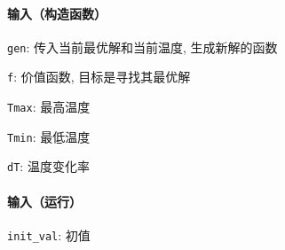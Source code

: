 \paragraph{输入（构造函数）}

\verb|gen|: 传入当前最优解和当前温度, 生成新解的函数

\verb|f|: 价值函数, 目标是寻找其最优解

\verb|Tmax|: 最高温度

\verb|Tmin|: 最低温度

\verb|dT|: 温度变化率

\paragraph{输入（运行）}

\verb|init_val|: 初值
